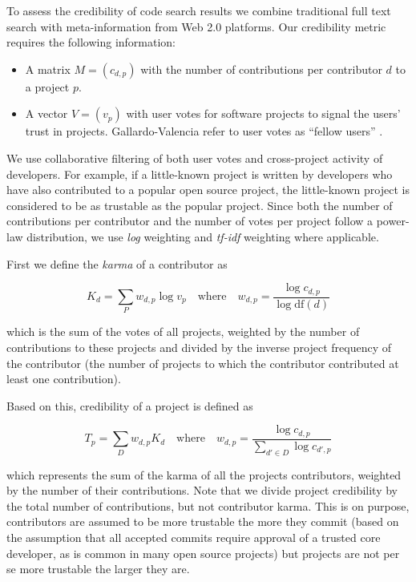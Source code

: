To assess the credibility of code search results we combine traditional full text search with meta-information from Web 2.0 platforms. Our credibility metric requires the following information:

\begin{itemize}
\item A matrix $M = (c_{d,p})$ with the number of contributions per contributor $d$ to a project $p$.
\item A vector $V = (v_p)$ with user votes for software projects to signal the users' trust in projects. Gallardo-Valencia \etal refer to user votes as ``fellow users'' \cite{Gall09a}.
\end{itemize}

We use collaborative filtering of both user votes and cross-project activity of developers. For example, if a little-known project is written by developers who have also contributed to a popular open source project, the little-known project is considered to be as trustable as the popular project. Since both the number of contributions per contributor and the number of votes per project follow a power-law distribution, we use \emph{log} weighting and \emph{tf-idf} \cite{Baez99b} weighting where applicable. 

First we define the \emph{karma} of a contributor as

    $$K_{d} = \sum_{P} w_{d,p} \log v_p
    \quad \mathrm{where} \quad 
    w_{d,p} = \frac{\log c_{d,p}}{\log \mathrm{df}(d)}$$

\noindent
which is the sum of the votes of all projects, weighted by the number of contributions to these projects and divided by the inverse project frequency of the contributor (\ie the number of projects to which the contributor contributed at least one contribution).


Based on this, credibility of a project is defined as 

	$$T_{p} = \sum_{D} w_{d,p} K_d
	\quad \mathrm{where} \quad 
	w_{d,p} = \frac{\log c_{d,p}}{\sum_{d' \in D} \log c_{d',p}}$$

\noindent
which represents the sum of the karma of all the projects contributors, weighted by the number of their contributions.
Note that we divide project credibility by the total number of contributions, but not contributor karma. This is on purpose, contributors are assumed to be more trustable the more they commit (based on the assumption that all accepted commits require approval of a trusted core developer, as is common in many open source projects) but projects are not per se more trustable the larger they are.

